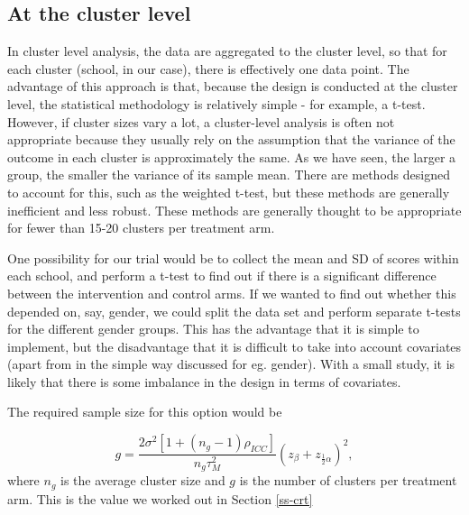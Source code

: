 \documentclass[
  openany]{book}
\theoremstyle{definition}
\theoremstyle{definition}
\theoremstyle{definition}
\theoremstyle{definition}
\theoremstyle{remark}
\begin{document}
\subsection{At the cluster level}\label{at-the-cluster-level}

In cluster level analysis, the data are aggregated to the cluster level, so that for each cluster (school, in our case), there is effectively one data point. The advantage of this approach is that, because the design is conducted at the cluster level, the statistical methodology is relatively simple - for example, a t-test. However, if cluster sizes vary a lot, a cluster-level analysis is often not appropriate because they usually rely on the assumption that the variance of the outcome in each cluster is approximately the same. As we have seen, the larger a group, the smaller the variance of its sample mean. There are methods designed to account for this, such as the weighted t-test, but these methods are generally inefficient and less robust. These methods are generally thought to be appropriate for fewer than 15-20 clusters per treatment arm.

One possibility for our trial would be to collect the mean and SD of scores within each school, and perform a t-test to find out if there is a significant difference between the intervention and control arms. If we wanted to find out whether this depended on, say, gender, we could split the data set and perform separate t-tests for the different gender groups. This has the advantage that it is simple to implement, but the disadvantage that it is difficult to take into account covariates (apart from in the simple way discussed for eg. gender). With a small study, it is likely that there is some imbalance in the design in terms of covariates.

The required sample size for this option would be

\[
g = \frac{2 \sigma^2 \left[1+ \left(n_g-1\right)\rho_{ICC}\right]}{n_g\tau^2_M}\left(z_{\beta} + z_{\frac{1}{2}\alpha}\right)^2,
\]
where \(n_g\) is the average cluster size and \(g\) is the number of clusters per treatment arm. This is the value we worked out in Section \ref{ss-crt}
\end{document}
